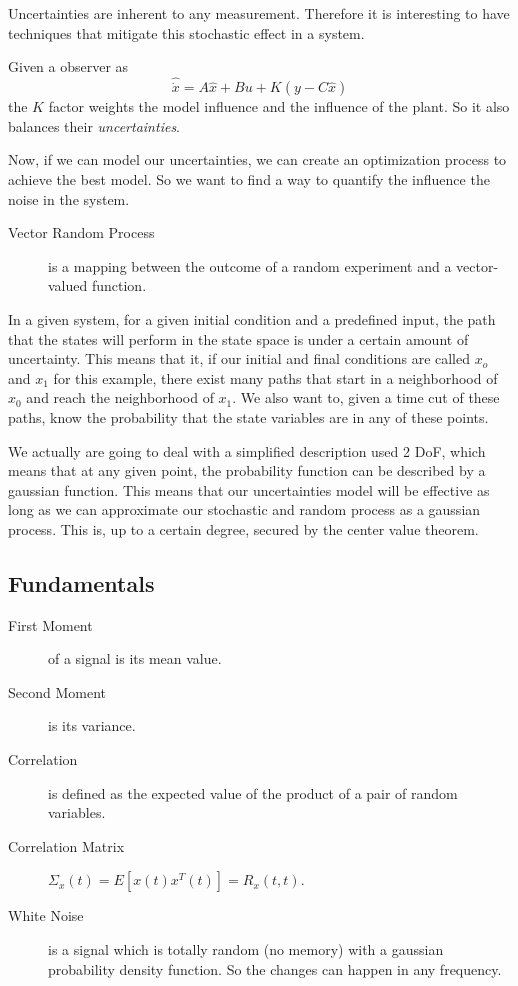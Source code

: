 
Uncertainties are inherent to any measurement. Therefore it is interesting to have techniques that mitigate this stochastic effect in a system.

Given a observer as \[
    \hat{\dot{x}}=A\hat{x}+Bu + K \left( y-C\hat{x} \right) 
\] the $K$ factor weights the model influence and the influence of the plant. So it also balances their \emph{uncertainties}.

Now, if we can model our uncertainties, we can create an optimization process to achieve the best model. So we want to find a way to quantify the influence the noise in the system.

\begin{description}
    \item[Vector Random Process] is a mapping between the outcome of a random experiment and a vector-valued function.
\end{description}

In a given system, for a given initial condition and a predefined input, the path that the states will perform in the state space is under a certain amount of uncertainty. This means that it, if our initial and final conditions are called $x_o$ and $x_1$ for this example, there exist many paths that start in a neighborhood of $x_0$ and reach the neighborhood of $x_1$. We also want to, given a time cut of these paths, know the probability that the state variables are in any of these points.

We actually are going to deal with a simplified description used 2 DoF, which means that at any given point, the probability function can be described by a gaussian function. This means that our uncertainties model will be effective as long as we can approximate our stochastic and random process as a gaussian process. This is, up to a certain degree, secured by the center value theorem.

\subsection*{Fundamentals}

\begin{description}
    \item[First Moment] of a signal is its mean value.
    \item[Second Moment] is its variance.
    \item[Correlation] is defined as the expected value of the product of a pair of random variables.
    \item[Correlation Matrix] $\Sigma_x(t) = E\left[ x(t)x^{T}(t) \right] = R_x(t,t)$.
    \item[White Noise] is a signal which is totally random (no memory) with a gaussian probability density function. So the changes can happen in any frequency.
\end{description}


